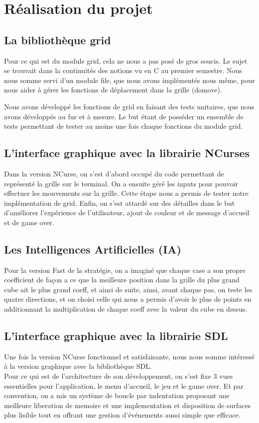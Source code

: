 \documentclass[12pt]{article}
\begin{document}
\section{Réalisation du projet}
\subsection{La bibliothèque grid}
Pour ce qui est du module grid, cela ne nous a pas posé de gros soucis. Le sujet se trouvait dans la continuités des notions vu en C au premier semestre.
Nous nous somme servi d'un module file, que nous avons implémentés nous même, pour nous aider à gérer les fonctions de déplacement dans la grille (domove).

Nous avons développé les fonctions de grid en faisant des tests unitaires, que nous avons développés au fur et à mesure. Le but étant de posséder un ensemble de tests permettant de tester au moins une fois chaque fonctions du module grid.

\subsection{L'interface graphique avec la librairie NCurses}
Dans la version NCurse, on s'est d'abord occupé du code permettant de représenté la grille sur le terminal. On a ensuite géré les inputs pour pouvoir effectuer les mouvements sur la grille. Cette étape nous a permis de tester notre implémentation de grid. Enfin, on s'est attardé sur des détailles dans le but d'améliorer l'expérience de l'utilisateur, ajout de couleur et de message d'accueil et de game over.


\subsection{Les Intelligences Artificielles (IA)}
Pour la version Fast de la stratégie, on a imaginé que chaque case a son propre coefficient de façon a ce que la meilleure position dans la grille du plus grand cube ait le plus grand coeff, et ainsi de suite, ainsi, avant chaque pas, on teste les quatre directions, et on choisi celle qui nous a permis d'avoir le plus de points en additionnant la multiplication de chaque coeff avec la valeur du cube en dessus.

\subsection{L'interface graphique avec la librairie SDL}
Une fois la version NCurse fonctionnel et satisfaisante, nous nous somme intéressé à la version graphique avec la bibliothèque SDL.\\
Pour ce qui est de l'architecture de son développement, on s'est fixe 3 vues essentielles pour l'application, le menu d'accueil, le jeu et le game over. Et par convention, on a mis un système de boucle par indentation proposant une meilleure liberation de memoire et une implementation et disposition de surfaces plus lisible tout en offrant une gestion d'événements aussi simple que efficace.\\
\end{document}
